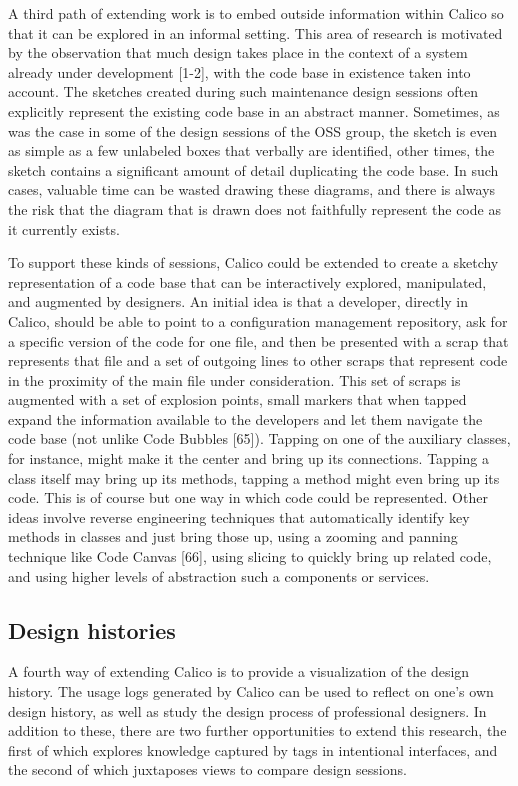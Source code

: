 A third path of extending work is to embed outside information within Calico so that it can be explored in an informal setting. This area of research is motivated by the observation that much design takes place in the context of a system already under development [1-2], with the code base in existence taken into account. The sketches created during such maintenance design sessions often explicitly represent the existing code base in an abstract manner. Sometimes, as was the case in some of the design sessions of the OSS group, the sketch is even as simple as a few unlabeled boxes that verbally are identified, other times, the sketch contains a significant amount of detail duplicating the code base. In such cases, valuable time can be wasted drawing these diagrams, and there is always the risk that the diagram that is drawn does not faithfully represent the code as it currently exists.

To support these kinds of sessions, Calico could be extended to create a sketchy representation of a code base that can be interactively explored, manipulated, and augmented by designers. An initial idea is that a developer, directly in Calico, should be able to point to a configuration management repository, ask for a specific version of the code for one file, and then be presented with a scrap that represents that file and a set of outgoing lines to other scraps that represent code in the proximity of the main file under consideration. This set of scraps is augmented with a set of explosion points, small markers that when tapped expand the information available to the developers and let them navigate the code base (not unlike Code Bubbles [65]). Tapping on one of the auxiliary classes, for instance, might make it the center and bring up its connections. Tapping a class itself may bring up its methods, tapping a method might even bring up its code. This is of course but one way in which code could be represented. Other ideas involve reverse engineering techniques that automatically identify key methods in classes and just bring those up, using a zooming and panning technique like Code Canvas [66], using slicing to quickly bring up related code, and using higher levels of abstraction such a components or services.

\subsection{Design histories}

A fourth way of extending Calico is to provide a visualization of the design history. The usage logs generated by Calico can be used to reflect on one's own design history, as well as study the design process of professional designers. In addition to these, there are two further opportunities to extend this research, the first of which explores knowledge captured by tags in intentional interfaces, and the second of which juxtaposes views to compare design sessions.


